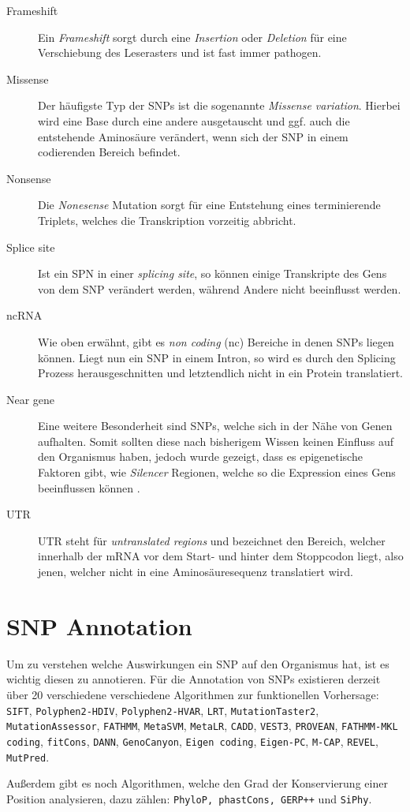 \begin{description}
\item[Frameshift]
Ein \emph{Frameshift} sorgt durch eine \emph{Insertion} oder \emph{Deletion} für eine Verschiebung des Leserasters und ist fast immer pathogen.
\item[Missense]
Der häufigste Typ der \ac{SNP}s ist die sogenannte \emph{Missense variation}. Hierbei wird eine Base durch eine andere ausgetauscht und ggf. auch die entstehende Aminosäure verändert, wenn sich der \ac{SNP} in einem codierenden Bereich befindet. 
\item[Nonsense]
Die \emph{Nonesense} Mutation sorgt für eine Entstehung eines terminierende Triplets, welches die Transkription vorzeitig abbricht.
\item[Splice site]
Ist ein SPN in einer \emph{splicing site}, so können einige Transkripte des Gens von dem \ac{SNP} verändert werden, während Andere nicht beeinflusst werden.
\item[ncRNA]
Wie oben erwähnt, gibt es \emph{non coding} (nc) Bereiche in denen \ac{SNP}s liegen können. Liegt nun ein \ac{SNP} in einem Intron, so wird es durch den Splicing Prozess herausgeschnitten und letztendlich nicht in ein Protein translatiert. 
\item[Near gene]
Eine weitere Besonderheit sind SNPs, welche sich in der Nähe von Genen aufhalten. Somit sollten diese nach bisherigem Wissen keinen Einfluss auf den Organismus haben, jedoch wurde gezeigt, dass es epigenetische Faktoren gibt, wie \emph{Silencer} Regionen, welche so die Expression eines Gens beeinflussen können \cite{Maston.2006}. 
\item[UTR]
UTR steht für \emph{untranslated regions} und bezeichnet den Bereich, welcher innerhalb der mRNA vor dem Start- und hinter dem Stoppcodon liegt, also jenen, welcher nicht in eine Aminosäuresequenz translatiert wird.
\end{description}




\section{SNP Annotation}
\begin{sloppypar}
Um zu verstehen welche Auswirkungen ein \ac{SNP} auf den Organismus hat, ist es wichtig diesen zu annotieren. 
Für die Annotation von \ac{SNP}s existieren derzeit über 20 verschiedene verschiedene Algorithmen zur funktionellen Vorhersage: \texttt{SIFT}, \texttt{Polyphen2-HDIV}, \texttt{Polyphen2-HVAR}, \texttt{LRT}, \texttt{MutationTaster2}, \texttt{MutationAssessor}, \texttt{FATHMM}, \texttt{MetaSVM}, \texttt{MetaLR}, \texttt{CADD}, \texttt{VEST3}, \texttt{PROVEAN}, \texttt{FATHMM-MKL coding}, \texttt{fitCons}, \texttt{DANN}, \texttt{GenoCanyon}, \texttt{Eigen coding}, \texttt{Eigen-PC}, \texttt{M-CAP}, \texttt{REVEL}, \texttt{MutPred}. 
\end{sloppypar}
Außerdem gibt es noch Algorithmen, welche den Grad der Konservierung einer Position analysieren, dazu zählen: \texttt{PhyloP, phastCons, GERP++} und \texttt{SiPhy}.


